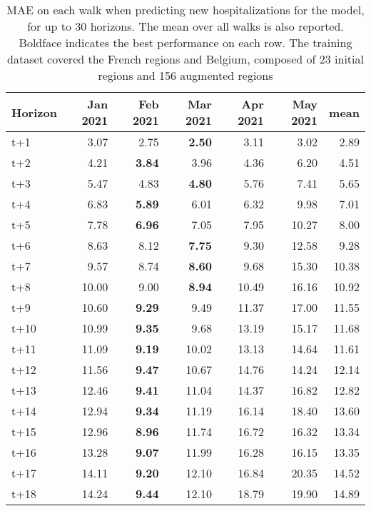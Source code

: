 \begin{table}[H]
\centering
\caption{MAE on each walk when predicting new hospitalizations for the model, for up to 30 horizons. The mean over all walks is also reported. Boldface indicates the best performance on each row. The training dataset covered the French regions and Belgium, composed of 23 initial regions and 156 augmented regions }
\label{tab:MAE_walk_dense_model}
\begin{tabular}{lrrrrrr}
\toprule
Horizon &  Jan 2021 &  Feb 2021 &  Mar 2021 &  Apr 2021 &  May 2021 &  mean \\
\midrule
t+1  & 3.07  & 2.75  & \textbf{2.50}  & 3.11  & 3.02  & 2.89  \\
t+2  & 4.21  & \textbf{3.84}  & 3.96  & 4.36  & 6.20  & 4.51  \\
t+3  & 5.47  & 4.83  & \textbf{4.80}  & 5.76  & 7.41  & 5.65  \\
t+4  & 6.83  & \textbf{5.89}  & 6.01  & 6.32  & 9.98  & 7.01  \\
t+5  & 7.78  & \textbf{6.96}  & 7.05  & 7.95  & 10.27  & 8.00  \\
t+6  & 8.63  & 8.12  & \textbf{7.75}  & 9.30  & 12.58  & 9.28  \\
t+7  & 9.57  & 8.74  & \textbf{8.60}  & 9.68  & 15.30  & 10.38  \\
t+8  & 10.00  & 9.00  & \textbf{8.94}  & 10.49  & 16.16  & 10.92  \\
t+9  & 10.60  & \textbf{9.29}  & 9.49  & 11.37  & 17.00  & 11.55  \\
t+10  & 10.99  & \textbf{9.35}  & 9.68  & 13.19  & 15.17  & 11.68  \\
t+11  & 11.09  & \textbf{9.19}  & 10.02  & 13.13  & 14.64  & 11.61  \\
t+12  & 11.56  & \textbf{9.47}  & 10.67  & 14.76  & 14.24  & 12.14  \\
t+13  & 12.46  & \textbf{9.41}  & 11.04  & 14.37  & 16.82  & 12.82  \\
t+14  & 12.94  & \textbf{9.34}  & 11.19  & 16.14  & 18.40  & 13.60  \\
t+15  & 12.96  & \textbf{8.96}  & 11.74  & 16.72  & 16.32  & 13.34  \\
t+16  & 13.28  & \textbf{9.07}  & 11.99  & 16.28  & 16.15  & 13.35  \\
t+17  & 14.11  & \textbf{9.20}  & 12.10  & 16.84  & 20.35  & 14.52  \\
t+18  & 14.24  & \textbf{9.44}  & 12.10  & 18.79  & 19.90  & 14.89  \\

\end{tabular}
\end{table}
